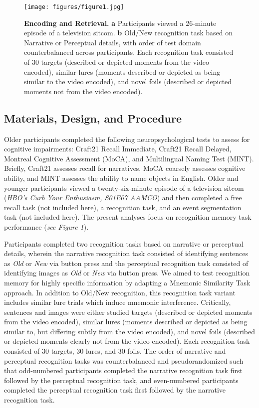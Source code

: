 \documentclass[11pt]{article}
\begin{document}
\begin{figure}
\centering
\texttt{[image: figures/figure1.jpg]}
\caption{\small \textbf{Encoding and Retrieval.} \textbf{a} Participants viewed a 26-minute episode of a television sitcom. \textbf{b} Old/New recognition task based on Narrative or Perceptual details, with order of test domain counterbalanced across participants. Each recognition task consisted of 30 targets (described or depicted moments from the video encoded), similar lures (moments described or depicted as being similar to the video encoded), and novel foils (described or depicted moments not from the video encoded).}
\label{fig:schematic}
\end{figure}

\subsection*{Materials, Design, and Procedure}
Older participants completed the following neuropsychological tests to assess for cognitive impairments: Craft21 Recall Immediate, Craft21 Recall Delayed, Montreal Cognitive Assessment (MoCA), and Multilingual Naming Test (MINT). Briefly, Craft21 assesses recall for narratives, MoCA coarsely assesses cognitive ability, and MINT assesses the ability to name objects in English. Older and younger participants viewed a twenty-six-minute episode of a television sitcom (\textit{HBO’s Curb Your Enthusiasm, S01E07 AAMCO}) and then completed a free recall task (not included here), a recognition task, and an event segmentation task (not included here). The present analyses focus on recognition memory task performance (\textit{see Figure 1}).

Participants completed two recognition tasks based on narrative or perceptual details, wherein the narrative recognition task consisted of identifying sentences as \textit{Old} or \textit{New} via button press and the perceptual recognition task consisted of identifying images as \textit{Old} or \textit{New} via button press. We aimed to test recognition memory for highly specific information by adapting a Mnemonic Similarity Task approach. In addition to Old/New recognition, this recognition task variant includes similar lure trials which induce mnemonic interference. Critically, sentences and images were either studied targets (described or depicted moments from the video encoded), similar lures (moments described or depicted as being similar to, but differing subtly from the video encoded), and novel foils (described or depicted moments clearly not from the video encoded). Each recognition task consisted of 30 targets, 30 lures, and 30 foils. The order of narrative and perceptual recognition tasks was counterbalanced and pseudorandomized such that odd-numbered participants completed the narrative recognition task first followed by the perceptual recognition task, and even-numbered participants completed the perceptual recognition task first followed by the narrative recognition task.       
\end{document}

